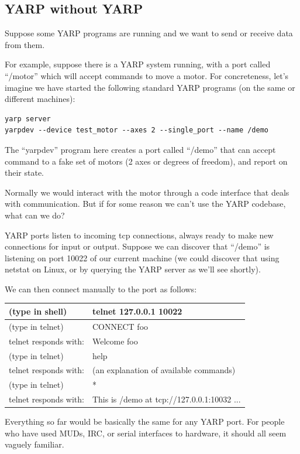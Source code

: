 \subsection{YARP without YARP}

Suppose some YARP programs are running and we want to send or
receive data from them.

For example, suppose there is a YARP system running, with a 
port called ``/motor'' which will accept commands to move a
motor.  For concreteness, let's imagine we have started the
following standard YARP programs (on the same or different 
machines):

\begin{verbatim}
yarp server
yarpdev --device test_motor --axes 2 --single_port --name /demo
\end{verbatim}

The ``yarpdev'' program here creates a port called ``/demo'' that can
accept command to a fake set of motors (2 axes or degrees of freedom),
and report on their state.

Normally we would interact with the motor through a code
interface that deals with communication.  But if for 
some reason we can't use the YARP codebase, what can
we do?

YARP ports listen to incoming tcp connections, always ready to make
new connections for input or output.  Suppose we can discover that
``/demo'' is listening on port 10022 of our current machine (we could
discover that using netstat on Linux, or by querying the YARP server
as we'll see shortly).

We can then connect manually to the port as follows:

\begin{tabular}{|l|l|}
\hline
(type in shell) & telnet 127.0.0.1 10022 \\
\hline
(type in telnet) & CONNECT foo \\
\hline
telnet responds with: & Welcome foo \\
\hline
(type in telnet) & help \\
\hline
telnet responds with: & (an explanation of available commands) \\
\hline
(type in telnet) & * \\
\hline
telnet responds with: & This is /demo at tcp://127.0.0.1:10032 ... \\
\hline
\end{tabular}

Everything so far would be basically the same for any YARP port.
For people who have used MUDs, IRC, or serial interfaces to hardware,
it should all seem vaguely familiar.

